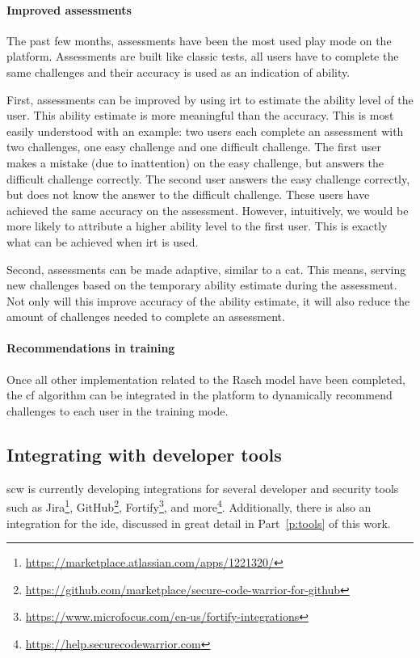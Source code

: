 \paragraph{Improved assessments}
The past few months, assessments have been the most used play mode on the platform.
Assessments are built like classic tests, all users have to complete the same challenges and their accuracy is used as an indication of ability.

First, assessments can be improved by using \gls{irt} to estimate the ability level of the user.
This ability estimate is more meaningful than the accuracy.
This is most easily understood with an example: two users each complete an assessment with two challenges, one easy challenge and one difficult challenge.
The first user makes a mistake (due to inattention) on the easy challenge, but answers the difficult challenge correctly.
The second user answers the easy challenge correctly, but does not know the answer to the difficult challenge.
These users have achieved the same accuracy on the assessment.
However, intuitively, we would be more likely to attribute a higher ability level to the first user.
This is exactly what can be achieved when \gls{irt} is used.

Second, assessments can be made adaptive, similar to a \gls{cat}.
This means, serving new challenges based on the temporary ability estimate during the assessment.
Not only will this improve accuracy of the ability estimate, it will also reduce the amount of challenges needed to complete an assessment.

\paragraph{Recommendations in training}
Once all other implementation related to the Rasch model have been completed, the \gls{cf} algorithm can be integrated in the platform to dynamically recommend challenges to each user in the training mode.

\subsection{Integrating with developer tools}
\label{sec:its-integration}
\Gls{scw} is currently developing integrations for several developer and security tools such as Jira\footnote{\url{https://marketplace.atlassian.com/apps/1221320/}}, GitHub\footnote{\url{https://github.com/marketplace/secure-code-warrior-for-github}}, Fortify\footnote{\url{https://www.microfocus.com/en-us/fortify-integrations}}, and more\footnote{\url{https://help.securecodewarrior.com}}.
Additionally, there is also an integration for the \gls{ide}, discussed in great detail in Part~\ref{p:tools} of this work.

